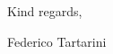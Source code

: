\documentclass[a4paper, 10pt]{letter}
\newcommand{\response}[1]{\textcolor{blue}{\textbf{Author response:} #1}}
\begin{document}
\begin{letter}



        Kind regards,

        \vspace*{5px}

        Federico Tartarini

    \end{letter}
\end{document}
